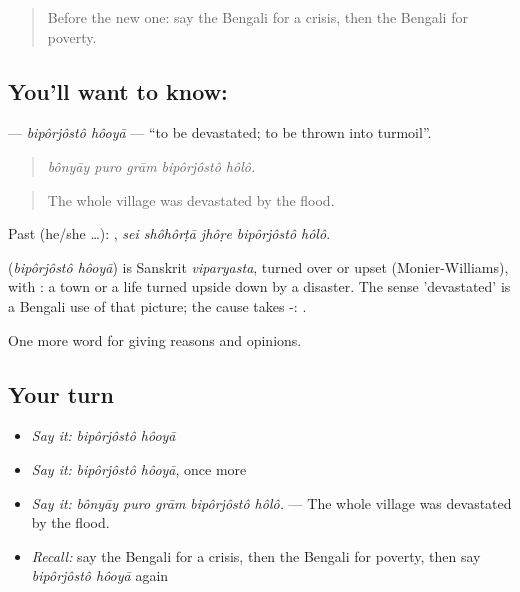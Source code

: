 \label{lesson:BN-C364-biporjosto-hooya}



\begin{quote}
Before the new one: say the Bengali for a crisis, then the Bengali for poverty.
\end{quote}

\subsection*{You'll want to know:  }
\textbf{ } — \emph{bipôrjôstô hôoyā} — \textquotedblleft{}to be devastated; to be thrown into turmoil\textquotedblright{}.

\begin{quote}
    
\end{quote}

\begin{quote}
\emph{bônyāy puro grām bipôrjôstô hôlô.}
\end{quote}

\begin{quote}
The whole village was devastated by the flood.
\end{quote}

Past (he/she …):     , \emph{sei shôhôrṭā jhôṛe bipôrjôstô hôlô}.

\begin{cousinweb}
\textbf{ } (\emph{bipôrjôstô hôoyā}) is Sanskrit \emph{viparyasta}, turned over or upset (Monier-Williams), with : a town or a life turned upside down by a disaster. The sense 'devastated' is a Bengali use of that picture; the cause takes -: .
\end{cousinweb}

\begin{grammarlens}[title={What you've built}]
One more word for giving reasons and opinions.
\end{grammarlens}

\subsection*{Your turn}
\begin{itemize}
\raggedright
  \item \emph{Say it:} \emph{bipôrjôstô hôoyā}
  \item \emph{Say it:} \emph{bipôrjôstô hôoyā}, once more
  \item \emph{Say it:} \emph{bônyāy puro grām bipôrjôstô hôlô.} — The whole village was devastated by the flood.
  \item \emph{Recall:} say the Bengali for a crisis, then the Bengali for poverty, then say \emph{bipôrjôstô hôoyā} again
\end{itemize}

